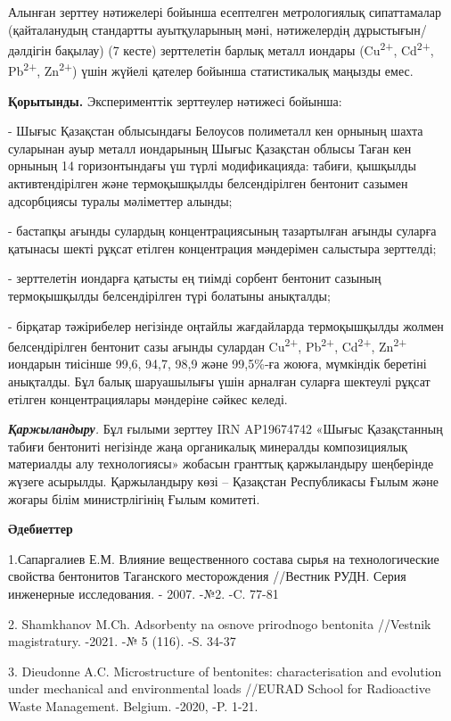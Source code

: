 Алынған зерттеу нәтижелері бойынша есептелген метрологиялық сипаттамалар
(қайталанудың стандартты ауытқуларының мәні, нәтижелердің
дұрыстығын/дәлдігін бақылау) (7 кесте) зерттелетін барлық металл иондары
(Cu\textsuperscript{2+}, Cd\textsuperscript{2+}, Pb\textsuperscript{2+},
Zn\textsuperscript{2+}) үшін жүйелі қателер бойынша статистикалық
маңызды емес.

{\bfseries Қорытынды.} Эксперименттік зерттеулер нәтижесі бойынша:

- Шығыс Қазақстан облысындағы Белоусов полиметалл кен орнының шахта
суларынан ауыр металл иондарының Шығыс Қазақстан облысы Таған кен
орнының 14 горизонтындағы үш түрлі модификацияда: табиғи, қышқылды
активтендірілген және термоқышқылды белсендірілген бентонит сазымен
адсорбциясы туралы мәліметтер алынды;

- бастапқы ағынды сулардың концентрациясының тазартылған ағынды суларға
қатынасы шекті рұқсат етілген концентрация мәндерімен салыстыра
зерттелді;

- зерттелетін иондарға қатысты ең тиімді сорбент бентонит сазының
термоқышқылды белсендірілген түрі болатыны анықталды;

- бірқатар тәжірибелер негізінде оңтайлы жағдайларда термоқышқылды
жолмен белсендірілген бентонит сазы ағынды сулардан
Cu\textsuperscript{2+}, Pb\textsuperscript{2+}, Cd\textsuperscript{2+},
Zn\textsuperscript{2+} иондарын тиісінше 99,6, 94,7, 98,9 және 99,5\%-ға
жоюға, мүмкіндік беретіні анықталды. Бұл балық шаруашылығы үшін арналған
суларға шектеулі рұқсат етілген концентрациялары мәндеріне сәйкес
келеді.

\emph{{\bfseries Қаржыландыру}.} Бұл ғылыми зерттеу IRN AP19674742 «Шығыс
Қазақстанның табиғи бентониті негізінде жаңа органикалық минералды
композициялық материалды алу технологиясы» жобасын гранттық қаржыландыру
шеңберінде жүзеге асырылды. Қаржыландыру көзі -- Қазақстан Республикасы
Ғылым және жоғары білім министрлігінің Ғылым комитеті.

{\bfseries Әдебиеттер}

1.Сапаргалиев Е.М. Влияние вещественного состава сырья на
технологические свойства бентонитов Таганского месторождения //Вестник
РУДН. Серия инженерные исследования. - 2007. -№2. -C. 77-81

2. Shamkhanov M.Ch. Adsorbenty na osnove prirodnogo bentonita //Vestnik
magistratury. -2021. -№ 5 (116). -S. 34-37

3. Dieudonne A.C. Microstructure of bentonites: characterisation and
evolution under mechanical and environmental loads //EURAD School for
Radioactive Waste Management. Belgium. -2020, -P. 1-21.

